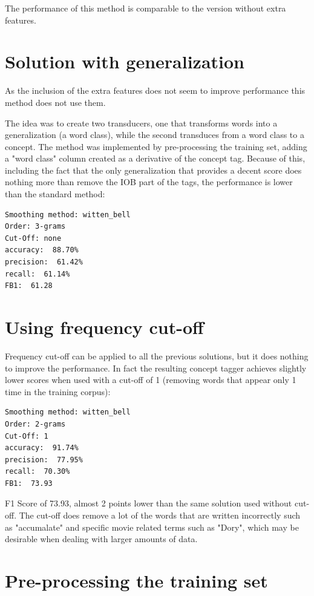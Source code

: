 \documentclass[11pt,a4paper]{article}
\begin{document}
The performance of this method is comparable to the version without extra features.


\section{Solution with generalization}
As the inclusion of the extra features does not seem to improve performance this method does not use them.

The idea was to create two transducers, one that transforms words into a generalization (a word class), while the second transduces from a word class to a concept. The method was implemented by pre-processing the training set, adding a "word class" column created as a derivative of the concept tag. Because of this, including the fact that the only generalization that provides a decent score does nothing more than remove the IOB part of the tags, the performance is lower than the standard method:
\begin{verbatim}
Smoothing method: witten_bell
Order: 3-grams
Cut-Off: none
accuracy:  88.70%
precision:  61.42%
recall:  61.14%
FB1:  61.28
\end{verbatim}

\section{Using frequency cut-off}

Frequency cut-off can be applied to all the previous solutions, but it does nothing to improve the performance.
In fact the resulting concept tagger achieves slightly lower scores when used with a cut-off of 1 (removing words that appear only 1 time in the training corpus):
\begin{verbatim}
Smoothing method: witten_bell
Order: 2-grams
Cut-Off: 1
accuracy:  91.74%
precision:  77.95%
recall:  70.30%
FB1:  73.93
\end{verbatim}

F1 Score of 73.93, almost 2 points lower than the same solution used without cut-off.
The cut-off does remove a lot of the words that are written incorrectly such as "accumalate" and specific movie related terms such as "Dory", which may be desirable when dealing with larger amounts of data.

\section{Pre-processing the training set}
\end{document}
